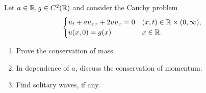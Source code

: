 \newpage
\begin{exercise}
    Let \(a \in \mathbb{R}, g \in C^2(\mathbb{R})\) and consider the Cauchy problem
    \[
        \begin{cases}
            u_{t} + a u_{xx} + 2 u u_{x} = 0 & (x, t) \in \mathbb{R} \times (0, \infty), \\
            u(x, 0) = g(x)                   & x \in \mathbb{R}.
        \end{cases}
    \]
    \begin{enumerate}
        \item Prove the conservation of mass.
        \item In dependence of \(a\), discuss the conservation of momentum.
        \item Find solitary waves, if any.
    \end{enumerate}
\end{exercise}
